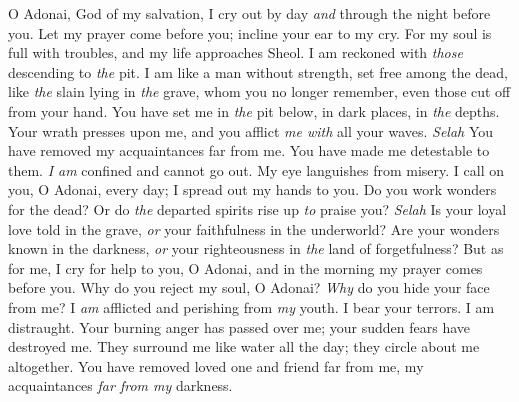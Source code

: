 \begin{biblechapter} %
 O Adonai, God of my salvation, 
I cry out by day \textit{and} through the night before you.
\verse Let my prayer come before you; 
incline your ear to my cry.
\verse For my soul is full with troubles, 
and my life approaches Sheol.
\verse I am reckoned with \textit{those} descending to \textit{the} pit. 
I am like a man without strength,
\verse set free among the dead, 
like \textit{the} slain lying in \textit{the} grave, 
whom you no longer remember, 
even those cut off from your hand.
\verse You have set me in \textit{the} pit below, 
in dark places, in \textit{the} depths.
\verse Your wrath presses upon me, 
and you afflict \textit{me with} all your waves. \textit{Selah}
\verse You have removed my acquaintances far from me. 
You have made me detestable to them. 
\textit{I am} confined and cannot go out.
\verse My eye languishes from misery. 
I call on you, O Adonai, every day; 
I spread out my hands to you.
\verse Do you work wonders for the dead? 
Or do \textit{the} departed spirits rise up \textit{to} praise you? \textit{Selah}
\verse Is your loyal love told in the grave, 
\textit{or} your faithfulness in the underworld?
\verse Are your wonders known in the darkness, 
\textit{or} your righteousness in \textit{the} land of forgetfulness?
\verse But as for me, I cry for help to you, O Adonai, 
and in the morning my prayer comes before you.
\verse Why do you reject my soul, O Adonai? 
\textit{Why} do you hide your face from me?
\verse I \textit{am} afflicted and perishing from \textit{my} youth. 
I bear your terrors. I am distraught.
\verse Your burning anger has passed over me; 
your sudden fears have destroyed me.
\verse They surround me like water all the day; 
they circle about me altogether.
\verse You have removed loved one and friend far from me, 
my acquaintances \textit{far from my} darkness.
\end{biblechapter}

